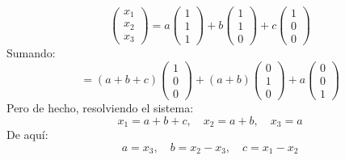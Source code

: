 \begin{prob}
\begin{myproof}
\[
\begin{pmatrix} x_1 \\ x_2 \\ x_3 \end{pmatrix} = a \begin{pmatrix} 1 \\ 1 \\ 1 \end{pmatrix} + b \begin{pmatrix} 1 \\ 1 \\ 0 \end{pmatrix} + c \begin{pmatrix} 1 \\ 0 \\ 0 \end{pmatrix}
\]
Sumando:
\[
= (a+b+c) \begin{pmatrix} 1 \\ 0 \\ 0 \end{pmatrix} + (a+b) \begin{pmatrix} 0 \\ 1 \\ 0 \end{pmatrix} + a \begin{pmatrix} 0 \\ 0 \\ 1 \end{pmatrix}
\]
Pero de hecho, resolviendo el sistema:
\[
x_1 = a + b + c,\quad x_2 = a + b,\quad x_3 = a
\]
De aquí:
\[
a = x_3,\quad b = x_2 - x_3,\quad c = x_1 - x_2
\]


\end{myproof}
\end{prob}
